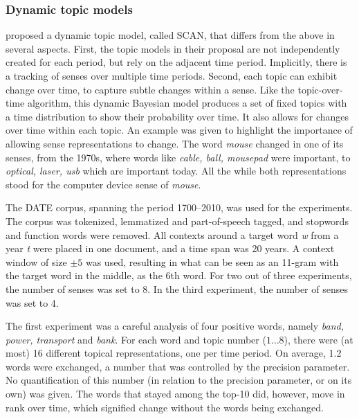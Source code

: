 \documentclass[output=paper]{langsci/langscibook}
\begin{document}
 
\subsubsection{Dynamic topic models}

\citet{frermann-lapata-2016-bayesian} proposed a dynamic topic model, called SCAN, that differs from the above in several aspects. First, the topic models in their proposal are not independently created for each period, but rely on the adjacent time period. Implicitly, there is a tracking of senses over multiple time periods. Second, each topic can exhibit change over time, to capture subtle changes within a sense. Like the topic-over-time algorithm, this dynamic Bayesian model produces a set of fixed topics with a time distribution to show their probability over time. It also allows for  changes over time within each topic. An example was given to highlight the importance of allowing sense representations to change.  The word \emph{mouse} changed in one of its senses, from the 1970s, where words like \emph{cable, ball, mousepad} were important, to \emph{optical, laser, usb} which are important today. All the while both representations stood for the computer device sense of \emph{mouse}.


The DATE corpus, spanning the period 1700--2010, was used for the experiments. The corpus was tokenized, lemmatized and part-of-speech tagged, and stopwords and function words were removed. All contexts around a target word \textit{w} from a year \textit{t} were placed in one document, and a time span was 20 years. A context window of size $\pm 5$ was used, resulting in what can be seen as an 11-gram with the target word in the middle, as the 6th word. For two out of three experiments, the number of senses was set to 8. In the third experiment, the number of senses was set to 4. 

The first experiment was a careful analysis of four positive words, namely \textit{band, power, transport} and \textit{bank}. 
For each word and topic number ($1 \ldots 8 $), there were (at most) 16 different topical representations, one per time period. 
On average, 1.2 words were exchanged, a number that was controlled by the precision parameter. No quantification of this number (in relation to the precision parameter, or on its own) was given. The words that stayed among the top-10 did, however, move in rank over time, which signified change without the words being exchanged. 
\end{document}
